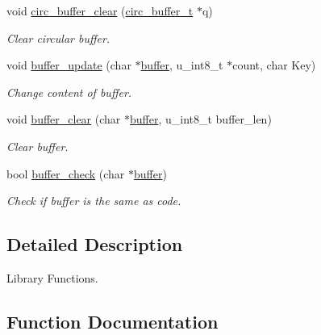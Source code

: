\begin{DoxyCompactItemize}
void \hyperlink{group___buffer___functions_ga5b404ab87c63d621304270ce477069c8}{circ\+\_\+buffer\+\_\+clear} (\hyperlink{structcirc__buffer__t}{circ\+\_\+buffer\+\_\+t} $\ast$q)
\begin{DoxyCompactList}\small\item\em Clear circular buffer. \end{DoxyCompactList}\item 
void \hyperlink{group___buffer___functions_ga3395befe3c015c7e1e959339a62abf40}{buffer\+\_\+update} (char $\ast$\hyperlink{global__variable_8h_ab8d1fd4179ebae69097d5e48772ec5c8}{buffer}, u\+\_\+int8\+\_\+t $\ast$count, char Key)
\begin{DoxyCompactList}\small\item\em Change content of buffer. \end{DoxyCompactList}\item 
void \hyperlink{group___buffer___functions_gafa520601202c789599d7c892bc62bc79}{buffer\+\_\+clear} (char $\ast$\hyperlink{global__variable_8h_ab8d1fd4179ebae69097d5e48772ec5c8}{buffer}, u\+\_\+int8\+\_\+t buffer\+\_\+len)
\begin{DoxyCompactList}\small\item\em Clear buffer. \end{DoxyCompactList}\item 
bool \hyperlink{group___buffer___functions_ga85b96695370782cfe63add97e6deaaf9}{buffer\+\_\+check} (char $\ast$\hyperlink{global__variable_8h_ab8d1fd4179ebae69097d5e48772ec5c8}{buffer})
\begin{DoxyCompactList}\small\item\em Check if buffer is the same as code. \end{DoxyCompactList}\end{DoxyCompactItemize}


\subsection{Detailed Description}
Library Functions. 



\subsection{Function Documentation}
\mbox{\label{group___buffer___functions_ga85b96695370782cfe63add97e6deaaf9}} 
